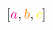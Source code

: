 \documentclass[preview]{standalone}
\begin{document}
$\left[\textcolor{magenta}{a}, \textcolor{orange}{b}, \textcolor{yellow}{c}\right]$
\end{document}
